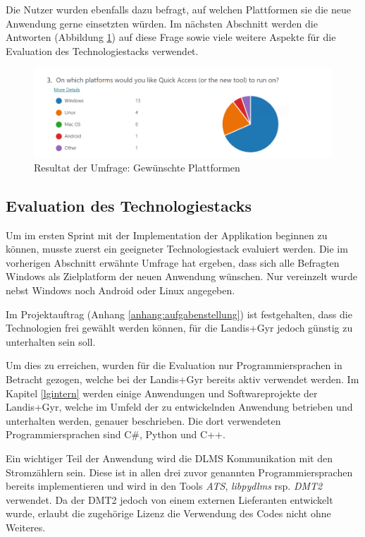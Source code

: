 Die Nutzer wurden ebenfalls dazu befragt, auf welchen Plattformen sie die neue Anwendung gerne einsetzten würden.
Im nächsten Abschnitt werden die Antworten (Abbildung \ref{fig:SurveryPlatforms}) auf diese Frage sowie viele weitere Aspekte für die Evaluation des Technologiestacks verwendet.

\begin{figure}[H]
   \centering
   \includegraphics[width=1.0\textwidth]{gfx/S0_Survey_Platform.png}
   \caption{
       Resultat der Umfrage: Gewünschte Plattformen
   }
   \label{fig:SurveryPlatforms}
\end{figure}

\subsection{Evaluation des Technologiestacks}
Um im ersten Sprint mit der Implementation der Applikation beginnen zu können, musste zuerst ein geeigneter Technologiestack evaluiert werden.
Die im vorherigen Abschnitt erwähnte Umfrage hat ergeben, dass sich alle Befragten Windows als Zielplatform der neuen Anwendung wünschen.
Nur vereinzelt wurde nebst Windows noch Android oder Linux angegeben.

Im Projektauftrag (Anhang \ref{anhang:aufgabenstellung}) ist festgehalten, dass die Technologien frei gewählt werden können, für die Landis+Gyr jedoch günstig zu unterhalten sein soll.

Um dies zu erreichen, wurden für die Evaluation nur Programmiersprachen in Betracht gezogen, welche bei der Landis+Gyr bereits aktiv verwendet werden.
Im Kapitel \ref{lgintern} werden einige Anwendungen und Softwareprojekte der Landis+Gyr, welche im Umfeld der zu entwickelnden Anwendung betrieben und unterhalten werden, genauer beschrieben.
Die dort verwendeten Programmiersprachen sind C\#, Python und C++.


Ein wichtiger Teil der Anwendung wird die \ac{DLMS} Kommunikation mit den Stromzählern sein.
Diese ist in allen drei zuvor genannten Programmiersprachen bereits implementieren und wird in den Tools \textit{\ac{ATS}}, \textit{libpydlms} rsp. \textit{\ac{DMT2}} verwendet.
Da der \ac{DMT2} jedoch von einem externen Lieferanten entwickelt wurde, erlaubt die zugehörige Lizenz die Verwendung des Codes nicht ohne Weiteres.


